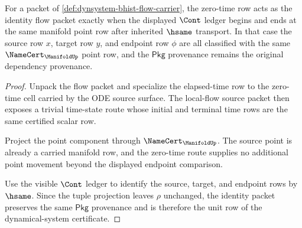 \begin{theorem}
\label{thm:dynsystem-flow-unit-ledger}
For a packet of \autoref{def:dynsystem-bhist-flow-carrier}, the zero-time row acts as the identity flow packet exactly when the displayed $\Cont$ ledger begins and ends at the same manifold point row after inherited $\hsame$ transport. In that case the source row $x$, target row $y$, and endpoint row $\phi$ are all classified with the same $\NameCert_{\ManifoldUp}$ point row, and the $\mathsf{Pkg}$ provenance remains the original dependency provenance.
\end{theorem}
\begin{proof}
Unpack the flow packet and specialize the elapsed-time row to the zero-time cell carried by the ODE source surface. The local-flow source packet then exposes a trivial time-state route whose initial and terminal time rows are the same certified scalar row.

Project the point component through $\NameCert_{\ManifoldUp}$. The source point is already a carried manifold row, and the zero-time route supplies no additional point movement beyond the displayed endpoint comparison.

Use the visible $\Cont$ ledger to identify the source, target, and endpoint rows by $\hsame$. Since the tuple projection leaves $\rho$ unchanged, the identity packet preserves the same $\mathsf{Pkg}$ provenance and is therefore the unit row of the dynamical-system certificate.
\end{proof}

